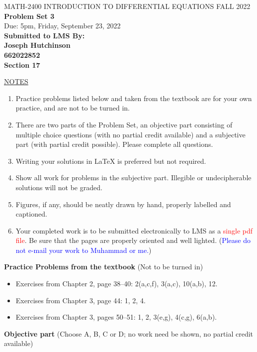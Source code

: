\documentclass{article}
\begin{document}
\begin{center}
\large{ MATH-2400 \hspace{.27in}  INTRODUCTION TO DIFFERENTIAL EQUATIONS \hspace{.27in}FALL 2022\bigskip\\ {\bf Problem Set 3} \smallskip\\ Due: 5pm, Friday, September 23, 2022}\\
\textbf{Submitted to LMS By:\\ Joseph Hutchinson\\ 662022852 \\ Section 17 }
\end{center}

\bigskip\noindent
\underline{NOTES}
\begin{enumerate}
\item Practice problems listed below and taken from the textbook are for your own practice, and are not to be turned in.
\item There are two parts of the Problem Set, an objective part consisting of multiple choice questions (with no partial credit available) and a subjective part (with partial credit possible).  Please complete all questions.
\item Writing your solutions in {\LaTeX} is preferred but not required.
\item Show all work for problems in the subjective part.  Illegible or undecipherable solutions will not be graded. 
\item Figures, if any, should be neatly drawn by hand, properly labelled and captioned.  
\item Your completed work is to be submitted electronically to LMS  as a \textcolor{red}{single pdf file}. Be sure that the pages are properly oriented and well lighted.  (\textcolor{blue}{Please do not e-mail your work to Muhammad or me.})
\end{enumerate}

\bigskip\noindent
{\bf Practice Problems from the textbook} (Not to be turned in)
\begin{itemize}
\item
Exercises from Chapter 2, page 38--40: 2(a,c,f), 3(a,c), 10(a,b), 12.
\item
Exercises from Chapter 3, page 44: 1, 2, 4.
\item
Exercises from Chapter 3, pages 50--51: 1, 2, 3(e,g), 4(c,g), 6(a,b).
\end{itemize}

\bigskip\noindent
{\bf Objective part} (Choose A, B, C or D; no work need be shown, no partial credit available)
\end{document}
